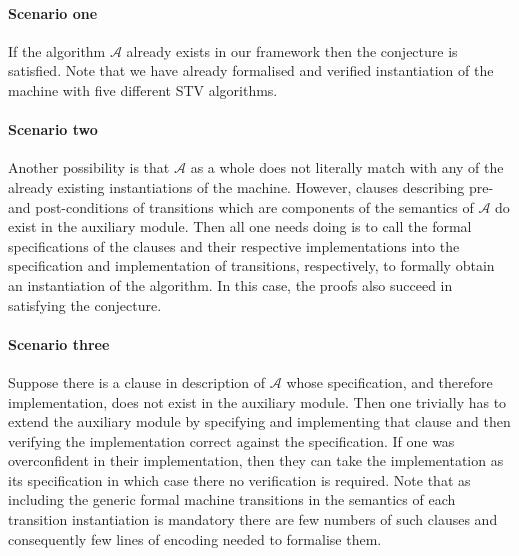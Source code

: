 \documentclass[10pt,conference]{IEEEtran}
\begin{document}
 \paragraph*{Scenario one} If the algorithm $\mathcal{A}$ already exists in our framework then the conjecture is satisfied. Note that we have already formalised and verified instantiation of the machine with five different STV algorithms.
 \paragraph*{Scenario two} Another possibility is that 
 $\mathcal{A}$ as a whole does not literally match with any of the already existing instantiations of the machine. However, clauses describing pre- and post-conditions of transitions which are components of the semantics of $\mathcal{A}$ do exist in the auxiliary module. Then all one needs doing is to call the formal  specifications of the clauses and their respective implementations into the specification and implementation of transitions, respectively,  to formally obtain an instantiation of the algorithm. In this case, the proofs also succeed in satisfying the conjecture. 
 \paragraph*{Scenario three} 
 Suppose there is a clause in description of $\mathcal{A}$ whose specification, and  therefore implementation,  does not exist in the auxiliary module. Then one trivially has to extend the auxiliary module by specifying and implementing that clause and then verifying the implementation correct against the specification.  If one was overconfident in their implementation, then they can take the implementation as its specification in which case there no verification is required.  Note that as including the generic formal machine transitions in the semantics of each transition instantiation is mandatory 
 there are few  numbers of such clauses and consequently few lines of encoding needed to formalise them. 
 
\end{document}
